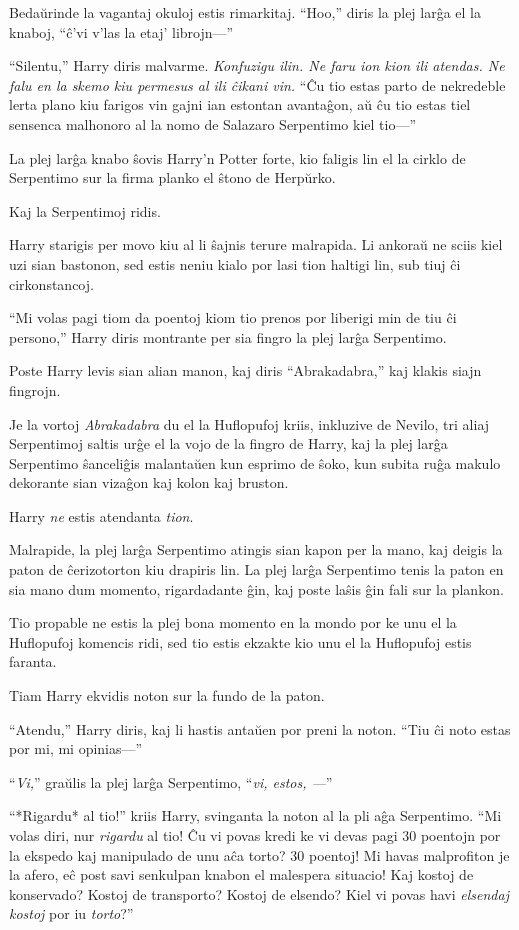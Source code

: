 Bedaŭrinde la vagantaj okuloj estis rimarkitaj. ``Hoo,'' diris la plej
larĝa el la knaboj, ``ĉ'vi v'las la etaj' librojn—''

``Silentu,'' Harry diris malvarme. \emph{Konfuzigu ilin. Ne faru ion kion ili
atendas. Ne falu en la skemo kiu permesus al ili ĉikani vin.} ``Ĉu tio estas
parto de nekredeble lerta plano kiu farigos vin gajni ian estontan avantaĝon, aŭ
ĉu tio estas tiel sensenca malhonoro al la nomo de Salazaro Serpentimo kiel
tio—''

La plej larĝa knabo ŝovis Harry'n Potter forte, kio faligis lin el la cirklo de
Serpentimo sur la firma planko el ŝtono de Herpŭrko.

Kaj la Serpentimoj ridis.

Harry starigis per movo kiu al li ŝajnis terure malrapida. Li ankoraŭ ne sciis
kiel uzi sian bastonon, sed estis neniu kialo por lasi tion haltigi lin, sub
tiuj ĉi cirkonstancoj.

``Mi volas pagi tiom da poentoj kiom tio prenos por liberigi min de tiu ĉi
persono,'' Harry diris montrante per sia fingro la plej larĝa Serpentimo.

Poste Harry levis sian alian manon, kaj diris ``Abrakadabra,'' kaj
klakis siajn fingrojn.

Je la vortoj \emph{Abrakadabra} du el la Huflopufoj kriis, inkluzive de Nevilo,
tri aliaj Serpentimoj saltis urĝe el la vojo de la fingro de Harry, kaj la plej
larĝa Serpentimo ŝanceliĝis malantaŭen kun esprimo de ŝoko, kun subita ruĝa
makulo dekorante sian vizaĝon kaj kolon kaj bruston.

Harry \emph{ne} estis atendanta \emph{tion}.

Malrapide, la plej larĝa Serpentimo atingis sian kapon per la mano, kaj deigis
la paton de ĉerizotorton kiu drapiris lin. La plej larĝa Serpentimo tenis la
paton en sia mano dum momento, rigardadante ĝin, kaj poste laŝis ĝin fali sur la
plankon.

Tio propable ne estis la plej bona momento en la mondo por ke unu el la
Huflopufoj komencis ridi, sed tio estis ekzakte kio unu el la Huflopufoj estis
faranta.

Tiam Harry ekvidis noton sur la fundo de la paton.

``Atendu,'' Harry diris, kaj li hastis antaŭen por preni la noton. ``Tiu ĉi noto
estas por mi, mi opinias—''

``\emph{Vi,}'' graŭlis la plej larĝa Serpentimo, ``\emph{vi, estos, —}''

``*Rigardu* al tio!'' kriis Harry, svinganta la noton al la pli aĝa Serpentimo.
``Mi volas diri, nur \emph{rigardu} al tio! Ĉu vi povas kredi ke vi devas pagi
30 poentojn por la ekspedo kaj manipulado de unu aĉa torto? 30 poentoj! Mi havas
malprofiton je la afero, eĉ post savi senkulpan knabon el malespera situacio!
Kaj kostoj de konservado? Kostoj de transporto? Kostoj de elsendo? Kiel vi povas
havi \emph{elsendaj kostoj} por iu \emph{torto}?''

